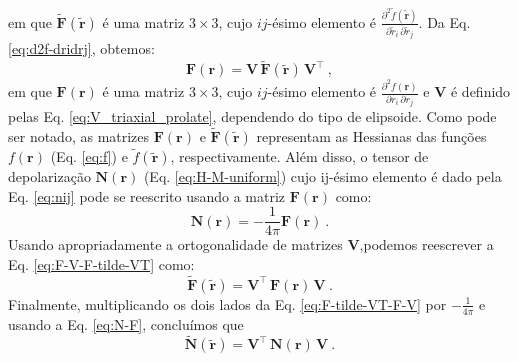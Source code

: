 em que $\tilde{\mathbf{F}}(\tilde{\mathbf{r}})$ é uma matriz $3 \times 3$, cujo $ij$-ésimo elemento é 
$\frac{\partial^{2} \tilde{f}(\tilde{\mathbf{r}})}
{\partial \tilde{r}_{i} \, \partial \tilde{r}_{j}}$.
Da Eq. \ref{eq:d2f-dridrj}, obtemos:
\begin{equation}
\mathbf{F}(\mathbf{r}) = \mathbf{V} \, 
\tilde{\mathbf{F}}(\tilde{\mathbf{r}}) \, \mathbf{V}^{\top} \: ,
\label{eq:F-V-F-tilde-VT}
\end{equation}
em que $\mathbf{F}(\mathbf{r})$ é uma matriz $3 \times 3$, cujo $ij$-ésimo elemento é 
$\frac{\partial^{2} f(\mathbf{r})}
{\partial r_{i} \, \partial r_{j}}$ e
$\mathbf{V}$ é definido pelas Eq. 
\ref{eq:V_triaxial_prolate}, dependendo do tipo de
elipsoide. Como pode ser notado, as matrizes $\mathbf{F}(\mathbf{r})$ e
$\tilde{\mathbf{F}}(\tilde{\mathbf{r}})$ representam as Hessianas
das funções $f(\mathbf{r})$ (Eq. \ref{eq:f})
e $\tilde{f}(\tilde{\mathbf{r}})$, respectivamente.
Além disso, o tensor de depolarização $\mathbf{N}(\mathbf{r})$
(Eq. \ref{eq:H-M-uniform}) cujo ij-ésimo elemento é dado pela Eq. \ref{eq:nij} pode se 
reescrito usando a matriz $\mathbf{F}(\mathbf{r})$
como:
\begin{equation}
\mathbf{N}(\mathbf{r}) = - \frac{1}{4 \pi} \mathbf{F}(\mathbf{r}) \: .
\label{eq:N-F}
\end{equation}
Usando apropriadamente a ortogonalidade de matrizes
$\mathbf{V}$,podemos reescrever a Eq. \ref{eq:F-V-F-tilde-VT}
como:
\begin{equation}
\tilde{\mathbf{F}}(\tilde{\mathbf{r}}) = \mathbf{V}^{\top} \, 
\mathbf{F}(\mathbf{r}) \, \mathbf{V} \: .
\label{eq:F-tilde-VT-F-V}
\end{equation}
Finalmente, multiplicando os dois lados da Eq. \ref{eq:F-tilde-VT-F-V}
por $-\frac{1}{4 \pi}$ e usando a Eq. \ref{eq:N-F},
concluímos que 
\begin{equation}
\tilde{\mathbf{N}}(\tilde{\mathbf{r}}) = 
\mathbf{V}^{\top} \, \mathbf{N}(\mathbf{r}) \, \mathbf{V} \: .
\label{eq:N-tilde-VT-N-V}
\end{equation}
